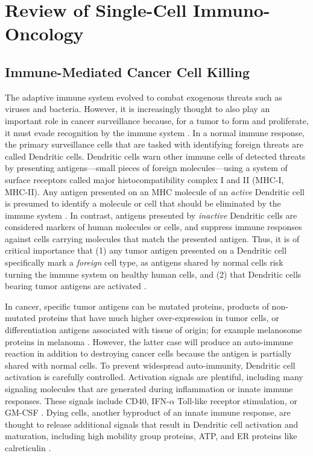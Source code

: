 
\chapter[Review of Single-Cell Immuno-Oncology][Review of Single-Cell Immuno-Oncology]{Review of Single-Cell Immuno-Oncology}


\section{Immune-Mediated Cancer Cell Killing}

The adaptive immune system evolved to combat exogenous threats such as viruses and bacteria. 
However, it is increasingly thought to also play an important role in cancer surveillance because, for a tumor to form and proliferate, it must evade recognition by the immune system \citep{Corthay2014}. 
In a normal immune response, the primary surveillance cells that are tasked with identifying foreign threats are called Dendritic cells. 
Dendritic cells warn other immune cells of detected threats by presenting antigens---small pieces of foreign molecules---using a system of surface receptors called major histocompatibility complex I and II (MHC-I, MHC-II).
Any antigen presented on an MHC molecule of an \textit{active} Dendritic cell is presumed to identify a molecule or cell that should be eliminated by the immune system \citep{Joffre2009}.
In contrast, antigens presented by \textit{inactive} Dendritic cells are considered markers of human molecules or cells, and suppress immune responses against cells carrying molecules that match the presented antigen.  
Thus, it is of critical importance that (1) any tumor antigen presented on a Dendritic cell specifically mark a \textit{foreign} cell type, as antigens shared by normal cells risk turning the immune system on healthy human cells, and (2) that Dendritic cells bearing tumor antigens are activated \citep{Darrasse-Jeze2009,Steinman2000}.

In cancer, specific tumor antigens can be mutated proteins, products of non-mutated proteins that have much higher over-expression in tumor cells, or differentiation antigens associated with tissue of origin; for example melanosome proteins in melanoma \citep{Boon2006,Segal2008}.
However, the latter case will produce an auto-immune reaction in addition to destroying cancer cells because the antigen is partially shared with normal cells.
To prevent widespread auto-immunity, Dendritic cell activation is carefully controlled.
Activation signals are plentiful, including many signaling molecules that are generated during inflammation or innate immune responses.
These signals include CD40, IFN-$\alpha$ Toll-like receptor stimulation, or GM-CSF \citep{Lippitz2013}. 
Dying cells, another byproduct of an innate immune response, are thought to release additional signals that result in Dendritic cell activation and maturation, including high mobility group proteins, ATP, and ER proteins like calreticulin \citep{Zitvogel2009}.

